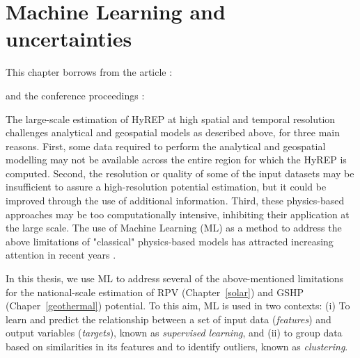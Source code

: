 \chapter{Machine Learning and \mbox{uncertainties}}
\label{methods_ML}

\vspace{-15pt} %
\begin{tcolorbox}[enhanced,width=\textwidth,size=fbox,
        sharp corners,colframe=black!5!white,drop fuzzy shadow southeast,
        boxrule=3mm, parbox=false] 
        
This chapter borrows from the article \citep{walch_big_2020}:

\qquad {}

and the conference proceedings \cite{walch_spatio-temporal_2019, walch_fast_2019-1}:

\quad {} 

\quad {}
\end{tcolorbox}

The large-scale estimation of HyREP at high spatial and temporal resolution challenges analytical and geospatial models as described above, for three main reasons.
First, some data required to perform the analytical and geospatial modelling may not be available across the entire region for which the HyREP is computed.
Second, the resolution or quality of some of the input datasets may be insufficient to assure a high-resolution potential estimation, but it could be improved through the use of additional information.
Third, these physics-based approaches may be too computationally intensive, inhibiting their application at the large scale.
The use of Machine Learning (ML) as a method to address the above limitations of "classical" physics-based models has attracted increasing attention in recent years \cite{willard_integrating_2020}. 

In this thesis, we use ML to address several of the above-mentioned limitations for the national-scale estimation of RPV (Chapter~\ref{solar}) and GSHP (Chaper~\ref{geothermal}) potential. 
To this aim, ML is used in two contexts: 
(i) To learn and predict the relationship between a set of input data (\textit{features}) and output variables (\textit{targets}), known as \textit{supervised learning}, 
and (ii) to group data based on similarities in its features and to identify outliers, known as \textit{clustering}. 

